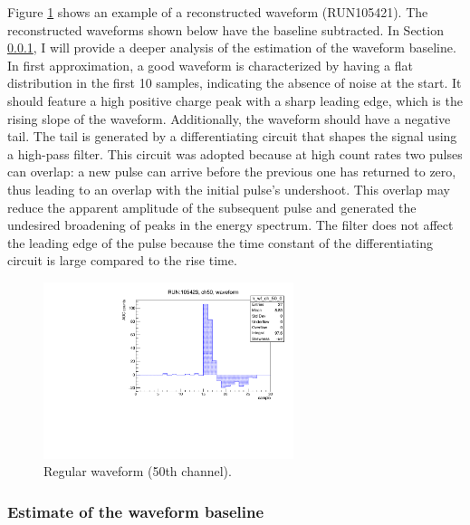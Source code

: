 Figure \ref{fig:normalwf} shows an example 
of a reconstructed waveform (RUN105421). 
The reconstructed waveforms shown below 
have the baseline subtracted. 
In Section \ref{basel}, I will provide a deeper 
analysis of the estimation of the waveform baseline. 
In first approximation, a good waveform is 
characterized by having a flat 
distribution in the first 10 samples, indicating the 
absence of noise at the start. It should feature a high 
positive charge peak with a sharp leading edge, which is 
the rising slope of the waveform. Additionally, the 
waveform should have a negative tail.
The tail is generated by a 
differentiating circuit that shapes the signal 
using a high-pass filter. This circuit was adopted 
because at high count rates two pulses can overlap: a 
new pulse can arrive before the previous one 
has returned to zero, thus leading to an overlap 
with the initial pulse's undershoot. This overlap 
may reduce the apparent amplitude of the subsequent 
pulse and generated the undesired broadening of peaks 
in the energy spectrum. 
The filter does not affect the leading edge 
of the pulse because the time constant of the 
differentiating circuit is large compared to the rise time.

\begin{figure}[!h]
  \centering
  \includegraphics[width=0.65\textwidth]{figures/pdf/wf_ch50_0.pdf}
  \caption[A regular waveform.]{Regular waveform (50th channel).}
 \label{fig:normalwf}
\end{figure}


\subsubsection{Estimate of the waveform baseline}\label{basel}


